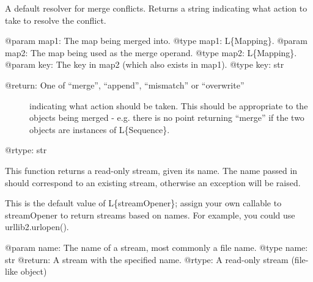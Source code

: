 \documentclass[a4paper,10pt,english]{sphinxmanual}
\begin{document}

\begin{fulllineitems}
\label{commands/apidoc/src:src.pyconf.deepCopyMapping}
\end{fulllineitems}


\begin{fulllineitems}
\label{commands/apidoc/src:src.pyconf.defaultMergeResolve}
A default resolver for merge conflicts. 
Returns a string indicating what action to take to resolve the conflict.

@param map1: The map being merged into.
@type map1: L\{Mapping\}.
@param map2: The map being used as the merge operand.
@type map2: L\{Mapping\}.
@param key: The key in map2 (which also exists in map1).
@type key: str
\begin{description}
\item[{@return: One of ``merge'', ``append'', ``mismatch'' or ``overwrite''}] \leavevmode
indicating what action should be taken. This should
be appropriate to the objects being merged - e.g.
there is no point returning ``merge'' if the two objects
are instances of L\{Sequence\}.

\end{description}

@rtype: str

\end{fulllineitems}


\begin{fulllineitems}
\label{commands/apidoc/src:src.pyconf.defaultStreamOpener}
This function returns a read-only stream, given its name. The name passed
in should correspond to an existing stream, otherwise an exception will be
raised.

This is the default value of L\{streamOpener\}; assign your own callable to
streamOpener to return streams based on names. For example, you could use
urllib2.urlopen().

@param name: The name of a stream, most commonly a file name.
@type name: str
@return: A stream with the specified name.
@rtype: A read-only stream (file-like object)

\end{fulllineitems}
\end{document}
